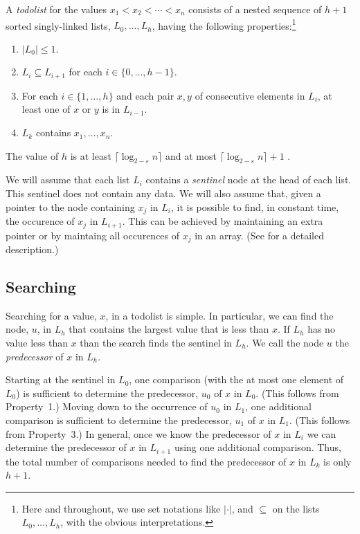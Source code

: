 \documentclass[lotsofwhite]{patmorin}
\begin{document}
A \emph{todolist} for the values $x_1<x_2<\cdots<x_n$ consists of a
nested sequence of $h+1$ sorted singly-linked lists, $L_0,\ldots,L_h$,
having the following properties:\footnote{Here and throughout, we use set
notations like $|\cdot|$, and $\subseteq$ on the lists $L_0,\ldots,L_h$,
with the obvious interpretations.}

\begin{enumerate}
\item $|L_0| \le 1$.
\item $L_i\subseteq L_{i+1}$ for each $i\in\{0,\ldots,h-1\}$.
\item For each $i\in\{1,\ldots,h\}$ and each pair $x,y$ of consecutive elements in $L_i$, at least one of $x$ or $y$ is in $L_{i-1}$.
\item $L_k$ contains $x_1,\ldots,x_n$.
\end{enumerate}

The value of $h$ is at least $\lceil \log_{2-\varepsilon} n\rceil$ and at most
$\lceil \log_{2-\varepsilon} n\rceil+1$ .

We will assume that each list $L_i$ contains a \emph{sentinel} node
at the head of each list. This sentinel does not contain any data.
We will also assume that, given a pointer to the node containing $x_j$
in $L_i$, it is possible to find, in constant time, the occurence of $x_j$
in $L_{i+1}$.  This can be achieved by maintaining an extra pointer or by
maintaing all occurences of $x_j$ in an array. (See 
for a detailed description.)

\subsection{Searching}

Searching for a value, $x$, in a todolist is simple. In particular, we
can find the node, $u$, in $L_h$ that contains the largest value that
is less than $x$. If $L_h$ has no value less than $x$ than the search
finds the sentinel in $L_h$.  We call the node $u$ the \emph{predecessor}
of $x$ in $L_h$.

Starting at the sentinel in $L_0$, one comparison (with the at most one
element of $L_0$) is sufficient to determine the predecessor, $u_0$ of $x$
in $L_0$. (This follows from Property~1.)  Moving down to the occurrence
of $u_0$ in $L_1$, one additional comparison is sufficient to determine
the predecessor, $u_1$ of $x$ in $L_1$. (This follows from Property~3.)
In general, once we know the predecessor of $x$ in $L_i$ we can determine
the predecessor of $x$ in $L_{i+1}$ using one additional comparison. Thus,
the total number of comparisons needed to find the predecessor of $x$
in $L_k$ is only $h+1$.
\end{document}
